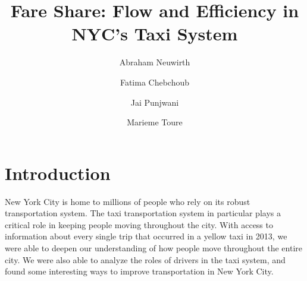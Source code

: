 \documentclass[]{article}
\title{Fare Share: Flow and Efficiency in NYC's Taxi System}
\author{Abraham Neuwirth}
\affil{Touro College}
\author{Fatima Chebchoub}
\affil{NYC College of Technology}
\author{Jai Punjwani}
\affil{Adelphi University}
\author{Marieme Toure}
\affil{NYC College of Technology}
\date{\vspace{-5ex}}
\begin{document}
\maketitle


\section{Introduction}
New York City is home to millions of people who rely on its robust transportation system. The taxi transportation system in particular plays a critical role in keeping people moving throughout the city. With access to information about every single trip that occurred in a yellow taxi in 2013, we were able to deepen our understanding of how people move throughout the entire city. We were also able to analyze the roles of drivers in the taxi system, and found some interesting ways to improve transportation in New York City. 
\end{document}
